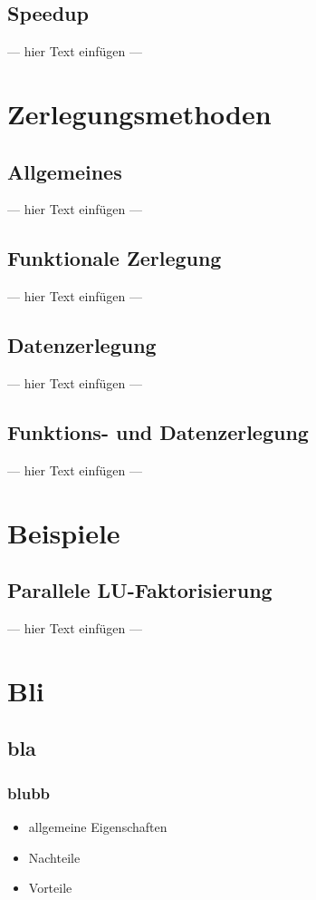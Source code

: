 \documentclass[a4paper, 12pt]{article}
\begin{document}
\subsection{Speedup}
--- hier Text einfügen ---



\section{Zerlegungsmethoden}


\subsection{Allgemeines}
--- hier Text einfügen ---


\subsection{Funktionale Zerlegung}
--- hier Text einfügen ---


\subsection{Datenzerlegung}
--- hier Text einfügen ---


\subsection{Funktions- und Datenzerlegung}
--- hier Text einfügen ---



\section{Beispiele}


\subsection{Parallele LU-Faktorisierung}
--- hier Text einfügen ---









\section{Bli}


\subsection{bla}

\subsubsection*{blubb}

\begin{itemize}
  \item allgemeine Eigenschaften
\end{itemize}
\begin{itemize}
  \renewcommand{\labelitemi}{\(-\)}%
  \item Nachteile
\end{itemize}
\begin{itemize}
  \renewcommand{\labelitemi}{+}%
  \item Vorteile
\end{itemize}
\end{document}
